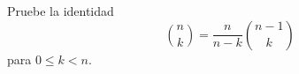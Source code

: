 \begin{statement}{11}
  Pruebe la identidad
  \[
    \binom{n}{k} = \frac{n}{n - k} \binom{n - 1}{k}
  \]
  para $0 \leq k < n$.
\end{statement}